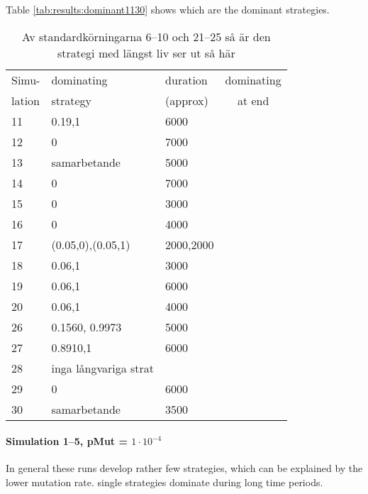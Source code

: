 Table \ref{tab:results:dominant1130} shows which are the dominant strategies.

\begin{table}[!hbtp]
  \footnotesize
  \centering
  \label{tab:results:dominant610}
  \caption{Av standardkörningarna 6--10 och 21--25 så är den strategi med längst liv ser ut så här}
  
  \begin{tabular}{lllc}
    Simu-  & dominating & duration  & dominating \\
    lation & strategy   & (approx)  & at end \\
    \hline
11  &  0.19,1              & 6000      \\          
12  &  0                   & 7000               \\ 
13  &  samarbetande        & 5000               \\ 
14  &  0                   & 7000               \\ 
15  &  0                   & 3000               \\ 
16  &  0                   & 4000      \\          
17  &  (0.05,0),(0.05,1)   & 2000,2000 \\          
18  &  0.06,1              & 3000               \\ 
19  &  0.06,1              & 6000      \\          
20  &  0.06,1              & 4000      \\          
26  & 0.1560, 0.9973       & 5000\\          
27  & 0.8910,1             & 6000\\          
28  & inga långvariga strat&              \\ 
29  & 0                    & 6000\\          
30  & samarbetande         & 3500\\          
    \hline
  \end{tabular}
\end{table}

\paragraph{Simulation 1--5, pMut = $1\cdot 10^{-4}$}
In general these runs develop rather few strategies, which can be explained by the lower mutation rate. single strategies dominate during long time periods. 
\mypar

